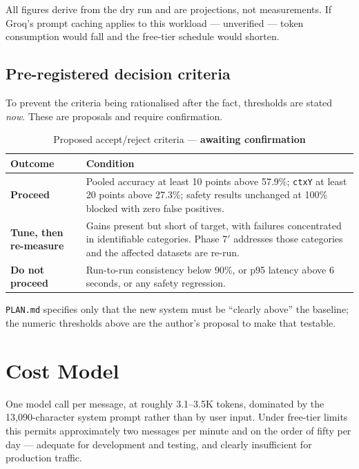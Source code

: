\documentclass[11pt,a4paper]{article}
\newcommand{\fn}[1]{\texttt{\small #1}}
\begin{document}
All figures derive from the dry run and are projections, not measurements. If Groq's prompt
caching applies to this workload --- unverified --- token consumption would fall and the
free-tier schedule would shorten.

\subsection{Pre-registered decision criteria}
\label{sec:gonogo}

To prevent the criteria being rationalised after the fact, thresholds are stated \emph{now}.
These are proposals and require confirmation.

\begin{table}[H]
\centering
\caption{Proposed accept/reject criteria --- \textbf{awaiting confirmation}}
\small
\begin{tabularx}{\textwidth}{@{}l>{\raggedright\arraybackslash}X@{}}
\toprule
\textbf{Outcome} & \textbf{Condition}\\
\midrule
\textbf{Proceed} & Pooled accuracy at least 10 points above 57.9\%; \fn{ctxY} at least 20
points above 27.3\%; safety results unchanged at 100\% blocked with zero false positives.\\
\addlinespace
\textbf{Tune, then re-measure} & Gains present but short of target, with failures concentrated
in identifiable categories. Phase 7$'$ addresses those categories and the affected datasets
are re-run.\\
\addlinespace
\textbf{Do not proceed} & Run-to-run consistency below 90\%, or p95 latency above 6 seconds,
or any safety regression.\\
\bottomrule
\end{tabularx}
\end{table}

\fn{PLAN.md} specifies only that the new system must be ``clearly above'' the baseline; the
numeric thresholds above are the author's proposal to make that testable.

\section{Cost Model}

One model call per message, at roughly 3.1--3.5K tokens, dominated by the 13{,}090-character
system prompt rather than by user input. Under free-tier limits this permits approximately two
messages per minute and on the order of fifty per day --- adequate for development and testing,
and clearly insufficient for production traffic.
\end{document}
